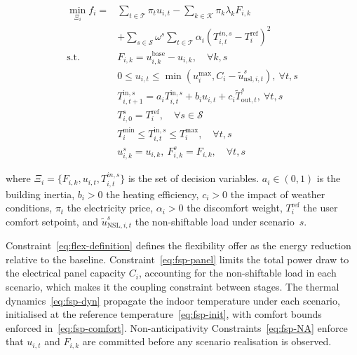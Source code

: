 \begin{subequations}
\label{eq:fsp-model}
\begin{align}
\min_{\Xi_i} f_i = & \sum_{t \in \mathcal{T}} \pi_t u_{i,t} - \sum_{k \in \mathcal{K}} \pi_{k} \lambda_{k} F_{i,k}   \\
& + \sum_{s \in \mathcal{S}} \omega^s \sum_{t \in \mathcal{T}} \alpha_i (T^{in,s}_{i,t} - T_i^{\text{ref}})^2 \label{eq:fsp-obj} \\
\text{s.t.} \quad & F_{i,k} = u_{i,k}^{\text{base}} - u_{i,k}, \quad \forall k, s \label{eq:flex-definition} \\
& 0 \leq u_{i,t} \leq \min(u_i^{\max}, C_i - \tilde{u}_{\text{nsl},i,t}^s), \ \forall t, s \label{eq:fsp-panel} \\
& T_{i,t+1}^{\text{in},s} = a_i T^{\text{in},s}_{i,t}+ b_i u_{i,t} + c_i \tilde{T}_{\text{out},t}^s, \ \forall t, s \label{eq:fsp-dyn} \\
& T_{i,0}^s = T_i^{\text{ref}}, \quad \forall s \in \mathcal{S} \label{eq:fsp-init} \\
& T_i^{\min} \leq T^{\text{in},s}_{i,t} \leq T_i^{\max}, \quad \forall t ,s \label{eq:fsp-comfort} \\
& u^s_{i,k} = u_{i,k}, \ F^s_{i,k} = F_{i,k}, \quad \forall t,s \label{eq:fsp-NA}
\end{align}
\end{subequations}

\noindent where $\Xi_i = \{F_{i,k}, u_{i,t}, T^{in,s}_{i,t}\}$ is the set of decision variables. $a_i \in (0,1)$ is the building inertia, $b_i > 0$ the heating efficiency, $c_i > 0$ the impact of weather conditions, $\pi_t$ the electricity price, $\alpha_i > 0$ the discomfort weight, $T_i^{\text{ref}}$ the user comfort setpoint, and $\tilde{u}_{\text{NSL},i,t}^s$ the non-shiftable load under scenario~$s$.

Constraint~\eqref{eq:flex-definition} defines the flexibility offer as the energy reduction relative to the baseline. Constraint~\eqref{eq:fsp-panel} limits the total power draw to the electrical panel capacity $C_i$, accounting for the non-shiftable load in each scenario, which makes it the coupling constraint between stages. The thermal dynamics~\eqref{eq:fsp-dyn} propagate the indoor temperature under each scenario, initialised at the reference temperature~\eqref{eq:fsp-init}, with comfort bounds enforced in~\eqref{eq:fsp-comfort}. Non-anticipativity Constraints~\eqref{eq:fsp-NA} enforce that $u_{i,t}$ and $F_{i,k}$ are committed before any scenario realisation is observed.
